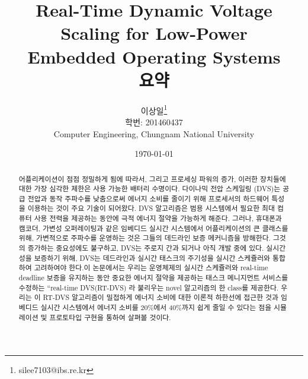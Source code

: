 \documentclass[11pt
  , a4paper
  , article
  , oneside
]{memoir}
\begin{document}
\newcommand{\technumber}{
  Low-Power Real-Time Scheduling\\
  Document 1: 2016-06-02}
\title{\textbf{Real-Time Dynamic Voltage Scaling for Low-Power \\
		Embedded Operating Systems \\
		요약 \\}}

\author{이상일\thanks{silee7103@ibs.re.kr} \\

  학번: 201460437\\
  Computer Engineering, Chungnam National University 
}
\date{\today}

\renewcommand{\maketitlehooka}{\begin{flushright}\textsf{\technumber}\end{flushright}}

\maketitle

\begin{abstract}
어플리케이션이 점점 정밀하게 됨에 따라서, 그리고 프로세싱 파워의 증가, 이러한 장치들에 대한 가장 심각한 제한은 사용 가능한 배터리 수명이다. 다이나믹 전압 스케일링 (DVS)는 공급 전압과 동작 주파수를 낮춤으로써 에너지 소비를 줄이기 위해 프로세서의 하드웨어 특성을 이용하는 것이 주요 기술이 되어왔다. DVS 알고리즘은 범용 시스템에서 필요한 최대 컴퓨터 사용 전력을 제공하는 동안에 극적 에너지 절약을 가능하게 해준다. 그러나, 휴대폰과 캠코더, 가변성 오퍼레이팅과 같은 임베디드 실시간 시스템에서 어플리케이션의 큰 클래스를 위해,  가변적으로 주파수를 운영하는 것은  그들의 데드라인 보증 메커니즘을 방해한다. 그것의 증가하는 중요성에도 불구하고, DVS는 주로지 간과 되거나 아직 개발 중에 있다. 실시간성을 보증하기 위해, DVS는 데드라인과 실시간 태스크의 주기성을 실시간 스케쥴러와 통합하여 고려하여야 한다.이 논문에서는 우리는 운영체제의 실시간 스케쥴러와 real-time deadline 보증을 유지하는 동안 중요한 에너지 절약을 제공하는 태스크 메니지먼트 서비스를 수정하는 “real-time DVS(RT-DVS) 라 불리우는 novel 알고리즘의 한 class를 제공한다. 우리는 이 RT-DVS  알고리즘이 밀접하게 에너지 소비에 대한 이론적 하한선에 접근한 것과 임베디드 실시간 시스템에서 에너지 소비를 20\%에서 40\%까지 쉽게 줄일 수 있다는 점을 시뮬레이션 및 프로토타입 구현을 통하여 살펴볼 것이다. 
\end{abstract}
\clearpage
\end{document}
